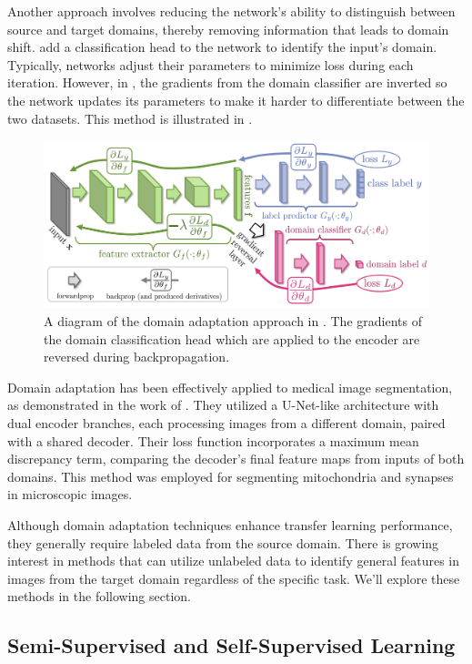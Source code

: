 Another approach involves reducing the network's ability to distinguish between source and target domains, thereby removing information that leads to domain shift. \citet{ganinDA2015} add a classification head to the network to identify the input's domain. Typically, networks adjust their parameters to minimize loss during each iteration. However, in \cite{ganinDA2015}, the gradients from the domain classifier are inverted so the network updates its parameters to make it harder to differentiate between the two datasets. This method is illustrated in .

\begin{figure}[t!]
 \centering
 \includegraphics[width=0.7\linewidth]{images/3/unsup-dom-adpt}
 \caption{A diagram of the domain adaptation approach in \citet{ganinDA2015}. The gradients of the domain classification head which are applied to the encoder are reversed during backpropagation.}
 \label{fig:unsup-dom-adpt}
\end{figure}
	
Domain adaptation has been effectively applied to medical image segmentation, as demonstrated in the work of \citet{bermudez-chaconDomainadaptiveTwostreamUNet2018}. They utilized a U-Net-like architecture with dual encoder branches, each processing images from a different domain, paired with a shared decoder. Their loss function incorporates a maximum mean discrepancy term, comparing the decoder’s final feature maps from inputs of both domains. This method was employed for segmenting mitochondria and synapses in microscopic images.

Although domain adaptation techniques enhance transfer learning performance, they generally require labeled data from the source domain. There is growing interest in methods that can utilize unlabeled data to identify general features in images from the target domain regardless of the specific task. We'll explore these methods in the following section.

	\subsection{Semi-Supervised and Self-Supervised Learning}
	
